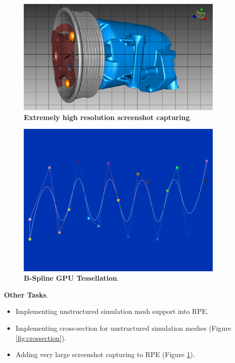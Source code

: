 \documentclass[]{report}
\begin{document}
\begin{figure}[!ht]
	\centering
	\includegraphics[width=0.90\textwidth]{./figs/highresscreenshot.png}
	\caption[Extremely high resolution screenshot capturing]{\textbf{Extremely high resolution screenshot capturing}.}
	\label{fig:highres}
\end{figure}

\begin{figure}[!ht]
	\centering
	\includegraphics[width=0.90\textwidth]{./figs/bspline.png}
	\caption[Extremely high resolution screenshot capturing]{\textbf{B-Spline GPU Tessellation}.}
	\label{fig:bspline}
\end{figure}

\textbf{Other Tasks}.
\begin{itemize}
	\item Implementing unstructured simulation mesh support into RPE.
	\item Implementing cross-section for unstructured simulation meshes (Figure \ref{fig:crossection}).
	\item Adding very large screenshot capturing to RPE (Figure \ref{fig:highres}).
\end{itemize}
 
\end{document}
